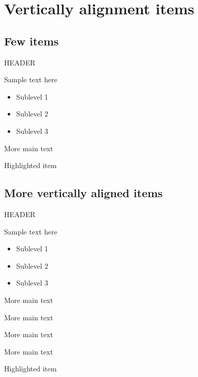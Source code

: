 \documentclass{beamer}
\begin{document}
	\section{Vertically alignment items}
	
	\subsection{Few items}
	
	\begin{frame}{HEADER}
		\begin{vfilleditems}
			\item Sample text here
			\begin{itemize}
				\item Sublevel 1
				\item Sublevel 2
				\item Sublevel 3
			\end{itemize}
			\item More main text
			\item \alert{Highlighted item}
		\end{vfilleditems}
	\end{frame}
	
	\subsection{More vertically aligned items}
		
	\begin{frame}{HEADER}
		\begin{vfilleditems}
			\item Sample text here
			\begin{itemize}
				\item Sublevel 1
				\item Sublevel 2
				\item Sublevel 3
			\end{itemize}
			\item More main text
			\item More main text
			\item More main text
			\item More main text
			\item \alert{Highlighted item}
		\end{vfilleditems}
	\end{frame}
	
\end{document}
